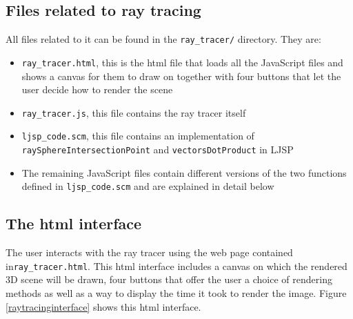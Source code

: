 \documentclass[11pt]{report}
\begin{document}
\subsection{Files related to ray tracing}
All files related to it can be found in the \texttt{ray_tracer/} directory. They are:
\begin{itemize}
\item \texttt{ray_tracer.html}, this is the html file that loads all the JavaScript files and shows a canvas for them to draw on together with four buttons that let the user decide how to render the scene
\item \texttt{ray_tracer.js}, this file contains the ray tracer itself
\item \texttt{ljsp_code.scm}, this file contains an implementation of \texttt{raySphereIntersectionPoint} and \texttt{vectorsDotProduct} in LJSP
\item The remaining JavaScript files contain different versions of the two functions defined in \texttt{ljsp_code.scm} and are explained in detail below
\end{itemize}


\subsection{The html interface}
The user interacts with the ray tracer using the web page contained in\texttt{ray_tracer.html}. This html interface includes a canvas on which the rendered 3D scene will be drawn, four buttons that offer the user a choice of rendering methods as well as a way to display the time it took to render the image. Figure \ref{raytracinginterface} shows this html interface.
\end{document}
